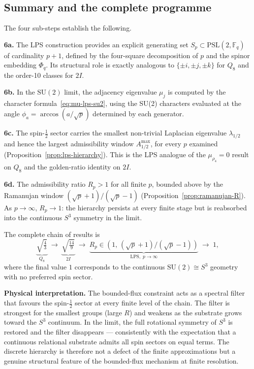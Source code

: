 \documentclass[11pt,a4paper]{article}
\begin{document}
\subsection{Summary and the complete programme}
\label{sec:step6-summary}

The four sub-steps establish the following.

\medskip
\noindent\textbf{6a.} The LPS construction provides an explicit generating
set $S_p \subset \mathrm{PSL}(2,\mathbb{F}_q)$ of cardinality $p+1$,
defined by the four-square decomposition of $p$ and the spinor embedding
$\Phi_q$.
Its structural role is exactly analogous to $\{\pm i,\pm j,\pm k\}$ for
$Q_8$ and the order-10 classes for $2I$.

\medskip
\noindent\textbf{6b.}
In the $\mathrm{SU}(2)$ limit, the adjacency eigenvalue
$\mu_j$ is computed by the character formula~\eqref{eq:mu-lps-su2},
using the SU(2) characters evaluated at the angle $\phi_a =
\arccos(a/\sqrt{p})$ determined by each generator.

\medskip
\noindent\textbf{6c.}
The spin-$\tfrac{1}{2}$ sector carries the smallest non-trivial
Laplacian eigenvalue $\lambda_{1/2}$ and hence the largest admissibility
window $A^{\max}_{1/2}$, for every $p$ examined
(Proposition~\ref{prop:lps-hierarchy}).
This is the LPS analogue of the $\mu_{\rho_4} = 0$ result on $Q_8$ and the
golden-ratio identity on $2I$.

\medskip
\noindent\textbf{6d.}
The admissibility ratio $R_p > 1$ for all finite $p$, bounded above by the
Ramanujan window $({\sqrt{p}+1})/({\sqrt{p}-1})$
(Proposition~\ref{prop:ramanujan-R}).
As $p \to \infty$, $R_p \to 1$: the hierarchy persists at every finite
stage but is reabsorbed into the continuous $S^3$ symmetry in the limit.

\medskip
The complete chain of results is
\begin{equation}
  \underbrace{\sqrt{\tfrac{4}{3}}}_{\displaystyle Q_8}
  \;\longrightarrow\;
  \underbrace{\sqrt{\tfrac{14}{9}}}_{\displaystyle 2I}
  \;\longrightarrow\;
  \underbrace{R_p \in (1,\,(\sqrt{p}+1)/(\sqrt{p}-1))}_{\displaystyle
  \mathrm{LPS},\; p \to \infty}
  \;\longrightarrow\;
  1,
  \label{eq:ratio-sequence}
\end{equation}
where the final value $1$ corresponds to the continuous $\mathrm{SU}(2)
\cong S^3$ geometry with no preferred spin sector.

\medskip
\noindent\textbf{Physical interpretation.}
The bounded-flux constraint acts as a spectral filter that favours the
spin-$\tfrac{1}{2}$ sector at every finite level of the chain.
The filter is strongest for the smallest groups (large $R$) and weakens
as the substrate grows toward the $S^3$ continuum.
In the limit, the full rotational symmetry of $S^3$ is restored and the
filter disappears — consistently with the expectation that a continuous
relational substrate admits all spin sectors on equal terms.
The discrete hierarchy is therefore not a defect of the finite
approximations but a genuine structural feature of the bounded-flux
mechanism at finite resolution.
\end{document}
